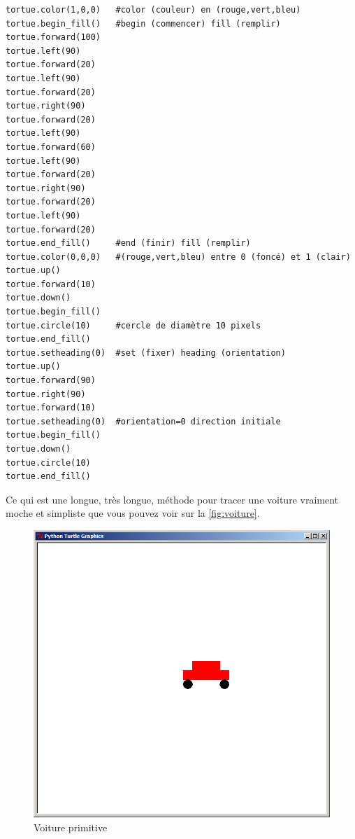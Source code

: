 \begin{Verbatim}[frame=single,rulecolor=\color{mbleu}, label=à copier-coller depuis le fichier du livre]
tortue.color(1,0,0)   #color (couleur) en (rouge,vert,bleu)
tortue.begin_fill()   #begin (commencer) fill (remplir)
tortue.forward(100)
tortue.left(90)
tortue.forward(20)
tortue.left(90)
tortue.forward(20)
tortue.right(90)
tortue.forward(20)
tortue.left(90)
tortue.forward(60)
tortue.left(90)
tortue.forward(20)
tortue.right(90)
tortue.forward(20)
tortue.left(90)
tortue.forward(20)
tortue.end_fill()     #end (finir) fill (remplir)
tortue.color(0,0,0)   #(rouge,vert,bleu) entre 0 (foncé) et 1 (clair)
tortue.up()
tortue.forward(10)
tortue.down()
tortue.begin_fill()
tortue.circle(10)     #cercle de diamètre 10 pixels
tortue.end_fill()
tortue.setheading(0)  #set (fixer) heading (orientation)
tortue.up()
tortue.forward(90)
tortue.right(90)
tortue.forward(10)
tortue.setheading(0)  #orientation=0 direction initiale
tortue.begin_fill()
tortue.down()
tortue.circle(10)
tortue.end_fill()
\end{Verbatim}

Ce qui est une longue, très longue, méthode pour tracer une voiture vraiment moche et simpliste que vous pouvez voir sur la \autoref{fig:voiture}.

\begin{figure}[h!]
\centering
\includegraphics[scale=0.4]{images/voiture}
\caption{Voiture primitive}\label{fig:voiture}
\end{figure}

